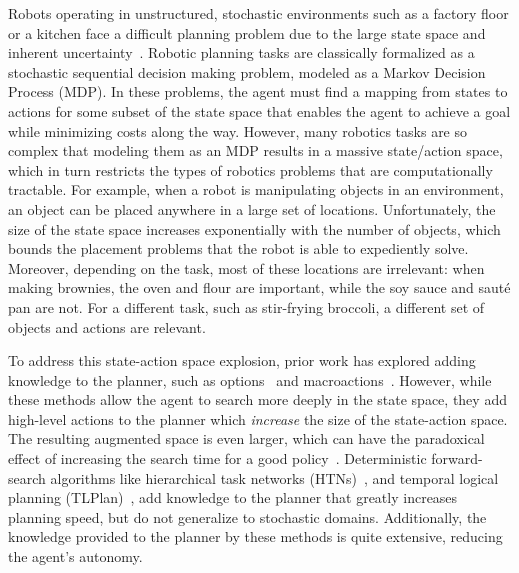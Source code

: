 \documentclass[conference]{IEEEtran}
\newcommand{\enote}[1]{\textcolor{Red}{\textbf{}}}
\begin{document}
Robots operating in unstructured, stochastic environments such as a
factory floor or a kitchen face a difficult planning problem due to
the large state space and inherent
uncertainty\enote{It's unclear as to what it is uncertainty about -- I want to fill this in but I'm not sure with what since I'm not sure what it's uncertainty about}~\citep{bollini12,knepper13}.  Robotic planning tasks are
classically formalized as a stochastic sequential decision making
problem, modeled as a Markov Decision Process (MDP). In these
problems, the agent must find a mapping from states to actions for
some subset of the state space that enables the agent to achieve a
goal while minimizing costs along the way. However, many robotics
tasks are so complex that modeling them as an MDP results in a massive
state/action \enote{we're inconsistent with our use of state/action space vs state-action space. Not sure what the convention is but we should pick one and replace all the other.} space, which in turn restricts the types of robotics
problems that are computationally tractable. For example, when a robot is
manipulating objects in an environment, an object can be placed
anywhere in a large set of locations. Unfortunately, the
size of the state space increases exponentially with the number of
objects, which bounds the placement problems that the robot is able to
expediently solve. \enote{it's unclear to me what the purpose of the remainder of this paragraph is -- the irrelevance of locations seems incongruous with the thrust of the rest of the paragraph (robotic planning problems are hard). It seems like this bit should be right before we introduce affordances in the introduction so as to provide a motivation for affordances} Moreover, depending on the task, most of
these locations are irrelevant: when making brownies, the
oven and flour are important, while the soy sauce and saut\'{e} pan
are not.  For a different task, such as stir-frying broccoli, a
different set of objects and actions are relevant.  

To address this state-action space explosion, prior work has explored
adding knowledge to the planner, such as options~\cite{sutton99} and
macroactions~\cite{Botea:2005kx,Newton:2005vn}.  However, while these
methods allow the agent to search more deeply in the state space, they
add high-level actions to the planner which {\em increase} the size of
the state-action space.  The resulting augmented space is even larger,
which can have the paradoxical effect of increasing the search time
for a good policy~\cite{Jong:2008zr}.  
Deterministic forward-search algorithms like hierarchical task
networks (HTNs)~\citep{Nau:1999:SSH:1624312.1624357}, and temporal
logical planning (TLPlan)~\citep{Bacchus95usingtemporal,Bacchus99usingtemporal},
add knowledge to the planner that greatly increases planning speed, but do
not generalize to stochastic domains. Additionally, the knowledge
provided to the planner by these methods is quite extensive, reducing the
agent's autonomy. 
\end{document}
